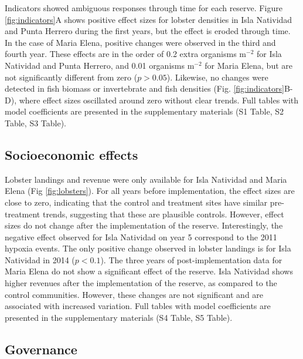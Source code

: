 \documentclass{frontiersSCNS}
\theoremstyle{definition}
\theoremstyle{definition}
\theoremstyle{definition}
\theoremstyle{remark}
\begin{document}
Indicators showed ambiguous responses through time for each reserve.
Figure \ref{fig:indicators}A shows positive effect sizes for lobster
densities in Isla Natividad and Punta Herrero during the first years,
but the effect is eroded through time. In the case of Maria Elena,
positive changes were observed in the third and fourth year. These
effects are in the order of 0.2 extra organisms \(\mathrm{m}^{-2}\) for
Isla Natividad and Punta Herrero, and 0.01 organisms \(\mathrm{m}^{-2}\)
for Maria Elena, but are not significantly different from zero
(\(p > 0.05\)). Likewise, no changes were detected in fish biomass or
invertebrate and fish densities (Fig. \ref{fig:indicators}B-D), where
effect sizes oscillated around zero without clear trends. Full tables
with model coefficients are presented in the supplementary materials (S1
Table, S2 Table, S3 Table).

\subsection{Socioeconomic effects}\label{socioeconomic-effects}

Lobster landings and revenue were only available for Isla Natividad and
Maria Elena (Fig \ref{fig:lobsters}). For all years before
implementation, the effect sizes are close to zero, indicating that the
control and treatment sites have similar pre-treatment trends,
suggesting that these are plausible controls. However, effect sizes do
not change after the implementation of the reserve. Interestingly, the
negative effect observed for Isla Natividad on year 5 correspond to the
2011 hypoxia events. The only positive change observed in lobster
landings is for Isla Natividad in 2014 (\(p < 0.1\)). The three years of
post-implementation data for Maria Elena do not show a significant
effect of the reserve. Isla Natividad shows higher revenues after the
implementation of the reserve, as compared to the control communities.
However, these changes are not significant and are associated with
increased variation. Full tables with model coefficients are presented
in the supplementary materials (S4 Table, S5 Table).

\subsection{Governance}\label{governance}
\end{document}
